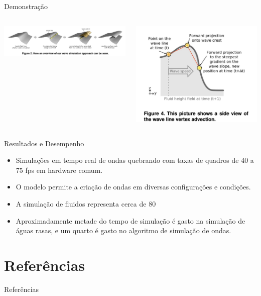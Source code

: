 \documentclass[aspectratio=169,xcolor=table]{beamer}
\begin{document}
\begin{frame}{Demonstração}
    \begin{columns}
        \centering
        \includegraphics[width=\textwidth]{imgs/real-time-1.png}
        
        \centering
        \includegraphics[width=\textwidth]{imgs/real-time-2.png}
    \end{columns}
\end{frame}

\begin{frame}{Resultados e Desempenho}
    \begin{itemize}
        \item Simulações em tempo real de ondas quebrando com taxas de quadros de 40 a 75 fps em hardware comum.
        \item O modelo permite a criação de ondas em diversas configurações e condições.
        \item A simulação de fluidos representa cerca de 80%
        \item Aproximadamente metade do tempo de simulação é gasto na simulação de águas rasas, e um quarto é gasto no algoritmo de simulação de ondas.
    \end{itemize}
\end{frame}

\section{Referências}
\begin{frame}[allowframebreaks]{Referências}
    \nocite{*}
    
    
\end{frame}
\end{document}
